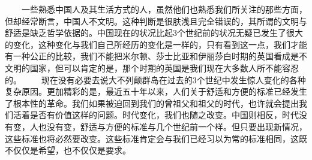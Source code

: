 \documentclass[12pt,oneside]{book}
\begin{document}
\begin{common-format}
　　一些熟悉中国人及其生活方式的人，虽然他们也熟悉我们所关注的那些方面，但却经常断言，中国人不文明。这种判断是很肤浅且完全错误的，其所谓的文明与舒适是缺乏哲学依据的。中国现在的状况比起3个世纪前的状况无疑已发生了很大的变化，这种变化与我们自己所经历的变化是一样的，只有看到这一点，我们才能有一种公正的比较，我们不能把米尔顿、莎士比亚和伊丽莎白时期的英国看成是不文明的国家，但可以肯定的是，那个时期的英国是我们现在大多数人所不能容忍的。 
　　现在没有必要去说大不列颠群岛在过去的3个世纪中发生惊人变化的各种复杂原因。更加精彩的是，最近五十年以来，人们关于舒适和方便的标准已经发生了根本性的革命。我们如果被迫回到我们的曾祖父和祖父的时代，也许就会提出我们活着是否有价值这样的问题。时代变化，我们也随之改变。中国则相反，时代没有变，人也没有变，舒适与方便的标准与几个世纪前一个样。但只要出现新情况，这些标准也将必然要改变。这些标准肯定会与我们已经习以为常的标准相同，这既不仅仅是希望，也不仅仅是要求。 


\end{common-format}
\end{document}
